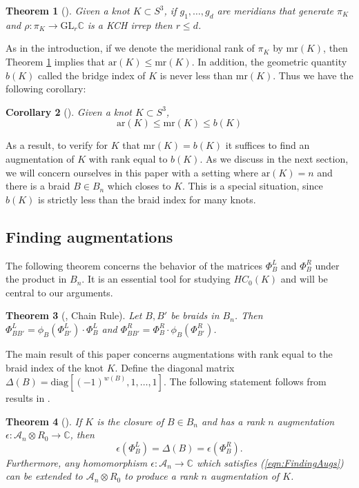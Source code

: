 \documentclass{amsart}[11pt,fullpage]
\def\ltgreen{green!20!white}
\def\C{{\mathbb C}}
\def\A{{\mathcal A}}
\newtheorem{thm}{Theorem}[section]
\newtheorem{cor}[thm]{Corollary}
\theoremstyle{definition}
\begin{document}
  \begin{thm}[\cite{Cor13b}] Given a knot $K\subset S^3$, if $g_1,\ldots,g_d$ are meridians that generate $\pi_K$ and $\rho:\pi_K\to\text{GL}_r\C$ is a KCH irrep then $r\le d$.
  \label{thm:DimBound}
  \end{thm}

  As in the introduction, if we denote the meridional rank of $\pi_K$ by $\text{mr}(K)$, then Theorem \ref{thm:DimBound} implies that $\text{ar}(K)\le\text{mr}(K)$. In addition, the geometric quantity $b(K)$ called the bridge index of $K$ is never less than $\text{mr}(K)$. Thus we have the following corollary:\todo[color=\ltgreen]{I made the inequality a corollary here}
    
\begin{cor}[\cite{Cor13b}] Given a knot $K\subset S^3$,
$$\text{ar}(K)\le\text{mr}(K)\le b(K)$$
\label{cor:DimBound}
\end{cor}

  As a result, to verify for $K$ that $\text{mr}(K)=b(K)$ it suffices to find an augmentation of $K$ with rank equal to $b(K)$. As we discuss in the next section, we will concern ourselves in this paper with a setting where $\text{ar}(K)=n$ and there is a braid $B\in B_n$ which closes to $K$. This is a special situation, since $b(K)$ is strictly less than the braid index for many knots.

\subsection{Finding augmentations}
\label{SecBG_AugExist}
  The following theorem concerns the behavior of the matrices $\Phi_B^L$ and $\Phi_B^R$ under the product in $B_n$. It is an essential tool for studying $HC_0(K)$ and will be central to our arguments.

  \begin{thm}[\cite{Ng05}, Chain Rule] Let $B,B'$ be braids in $B_n$. Then $\Phi_{BB'}^L = \phi_B(\Phi_{B'}^L)\cdot\Phi_B^L$ and $\Phi_{BB'}^R = \Phi_B^R\cdot\phi_B(\Phi_{B'}^R)$.
  \label{thm:ChainRule}
  \end{thm}

  The main result of this paper concerns augmentations with rank equal to the braid index of the knot $K$. Define the diagonal matrix $\Delta(B)=\text{diag}[(-1)^{w(B)},1,\ldots,1]$. The following statement follows from results in \cite[Section 5]{Cor13b}.

  \begin{thm}[\cite{Cor13a}] If $K$ is the closure of $B\in B_n$ and has a rank $n$ augmentation $\epsilon:\A_n\otimes R_0\to\C$, then 
    \begin{equation}
    \epsilon(\Phi_B^L)=\Delta(B)=\epsilon(\Phi_B^R).
    \label{eqn:FindingAugs}
    \end{equation}
    Furthermore, any homomorphism $\epsilon:\A_n\to\C$ which satisfies (\ref{eqn:FindingAugs}) can be extended to $\A_n\otimes R_0$ to produce a rank $n$ augmentation of $K$. 
  \label{thm:RanknAugs}
  \end{thm}
\end{document}
